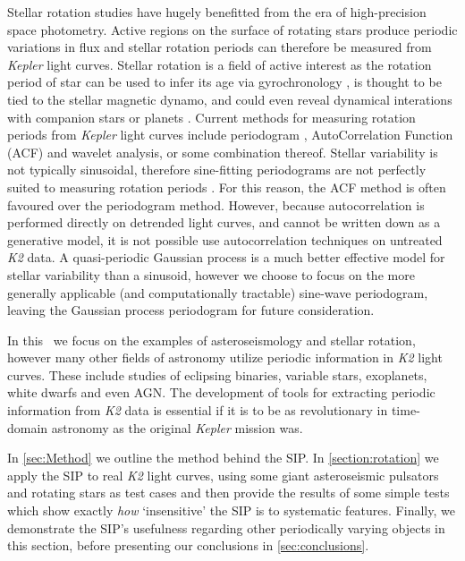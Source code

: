 Stellar rotation studies have hugely benefitted from the era of high-precision
space photometry.
Active regions on the surface of rotating stars produce periodic variations
in flux and stellar rotation periods can therefore be measured from
{\it Kepler} light curves.
Stellar rotation is a field of active interest as the rotation period of star
can be used to infer its age via gyrochronology
\citep{Skumanich1972, Barnes2007, Epstein2014, Angus2015}, is thought to be
tied to the stellar magnetic dynamo, and could even reveal dynamical
interations with companion stars or planets
\citep[e.g.][]{Beky2014, Poppenhaeger2014}.
Current methods for measuring rotation periods from {\it Kepler} light curves
include periodogram \citep[e.g.][]{Reinhold2013}, AutoCorrelation Function
(ACF) \citep{McQuillan2013} and wavelet \citep[e.g.][]{Garcia2014} analysis,
or some combination thereof.
Stellar variability is not typically sinusoidal, therefore sine-fitting
periodograms are not perfectly suited to measuring rotation periods
\citep{McQuillan2013}.
For this reason, the ACF method is often favoured over the periodogram method.
However, because autocorrelation is performed directly on detrended light
curves, and cannot be written down as a generative model, it is not possible
use autocorrelation techniques on untreated {\it K2} data.
A quasi-periodic Gaussian process is a much better effective model for stellar
variability than a sinusoid, however we choose to focus on the more generally
applicable (and computationally tractable) sine-wave periodogram, leaving the
Gaussian process periodogram for future consideration.

In this \article\ we focus on the examples of asteroseismology and stellar
rotation, however many other fields of astronomy utilize periodic information
in {\it K2} light curves.
These include studies of eclipsing binaries, variable stars, exoplanets, white
dwarfs and even AGN.
The development of tools for extracting periodic information from {\it K2}
data is essential if it is to be as revolutionary in time-domain
astronomy as the original {\it Kepler} mission was.

In \textsection\ref{sec:Method} we outline the method behind the SIP.
In \textsection\ref{section:rotation} we apply the SIP to real {\it K2} light
curves, using some giant asteroseismic pulsators and rotating stars as test
cases and then provide the results of some simple tests which show exactly
{\it how} `insensitive' the SIP is to systematic features.
Finally, we demonstrate the SIP's usefulness regarding other periodically
varying objects in this section, before presenting our conclusions in
\textsection\ref{sec:conclusions}.

